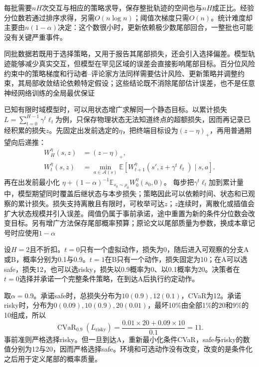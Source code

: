 每批需要$nH$次交互与相应的策略求导，保存整批轨迹的空间也与$nH$成正比。经验分位数若通过排序求得，另需$O(n\log n)$；阈值次梯度只需$O(n)$。统计难度却主要由$n(1-\alpha)$决定：这个数很小时，更新依赖极少数尾部回合，一整批也可能没有关键严重事件。

同批数据若既用于选择策略，又用于报告其尾部损失，还会引入选择偏差。模型轨迹能够减少真实交互，但模型在罕见区域的误差会直接影响尾部目标。百分位风险约束中的策略梯度和行动者--评论家方法同样需要估计风险、更新策略并调整约束，其局部收敛结论依赖特定假设；这些结论既不消除尾部估计误差，也不是任意神经网络训练的全局最优保证

已知有限时域模型时，可以用状态增广求解同一个静态目标。以累计损失
$L=\sum_{t=0}^{H-1}\gamma^t\ell_t$为例，只保存物理状态无法知道终点的超额损失，因而再记录已经积累的损失$z$。先固定出发前选定的$\eta$，把终端目标设为$(z-\eta)_+$，再用普通期望向后递推：
\begin{align}
  W_H^\eta(s,z)&=(z-\eta)_+, \nonumber\\
  W_t^\eta(s,z)&=\min_{a\in\mathcal A(s)}
       \mathbb E\!\left[
       W_{t+1}^\eta(s',z+\gamma^t\ell_t)\mid s,a\right].
  \label{eq:rl-trustworthy-augmented-risk}
\end{align}
再在出发前最小化
$\eta+(1-\alpha)^{-1}\mathbb E_{s_0\sim\rho_0}W_0^\eta(s_0,0)$。
每步把$\gamma^t\ell_t$加到累计量中，模型期望同时覆盖后继状态与本步损失；策略因此可以依赖时间、状态和已观察的累计损失。损失支持离散且有限时，可枚举可达$z$；$z$连续时，离散化或插值会扩大状态规模并引入误差。阈值仍属于事前承诺，途中重置为新的条件分位数会改变目标。另有增广方法保存尾部概率预算；原论文以尾部质量为参数，换成本章记号时应使用$1-\alpha$

\begin{example}[静态CVaR的时间不一致]
  \label{ex:rl-trustworthy-time-inconsistency}
  设$H=2$且不折扣。$t=0$只有一个虚拟动作，损失为0，随后进入可观察的分支A或B，概率分别为0.1与0.9。$t=1$在B只有一个动作，损失固定为10；在A可以选safe，损失12，也可以选risky，损失以0.9概率为0、以0.1概率为20。决策者在$t=0$选择并承诺一个完整条件策略，在到达A后执行约定动作。

  取$\alpha=0.9$。承诺safe时，总损失分布为$10(0.9),12(0.1)$，CVaR为12。承诺risky时，分布为$0(0.09),10(0.9),20(0.01)$，最坏10\%由全部1\%的20和9\%的10组成，所以
  \[
    \operatorname{CVaR}_{0.9}(L_{\text{risky}})
       =\frac{0.01\times20+0.09\times10}{0.1}=11.
  \]
  事前准则严格选择risky。但一旦到达A，重新最小化条件CVaR，safe与risky的数值分别为12与20，因而严格选择safe。环境和可选动作没有改变，改变的是条件化之后用于定义尾部的概率质量。
\end{example}

